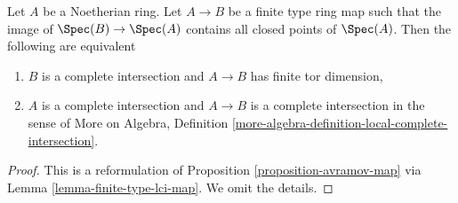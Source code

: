 \begin{lemma}
\label{lemma-avramov-map-finite-type}
Let $A$ be a Noetherian ring. Let $A \to B$ be a finite type ring map
such that the image of $\Spec(B) \to \Spec(A)$ contains all closed
points of $\Spec(A)$. Then the following are equivalent
\begin{enumerate}
\item $B$ is a complete intersection and $A \to B$ has finite
tor dimension,
\item $A$ is a complete intersection and $A \to B$ is a complete
intersection in the sense of More on Algebra, Definition
\ref{more-algebra-definition-local-complete-intersection}.
\end{enumerate}
\end{lemma}

\begin{proof}
This is a reformulation of Proposition \ref{proposition-avramov-map}
via Lemma \ref{lemma-finite-type-lci-map}.
We omit the details.
\end{proof}



















